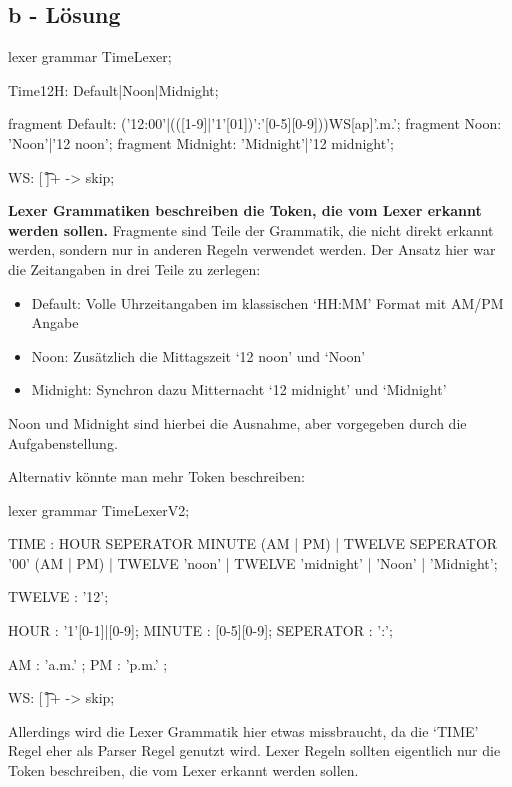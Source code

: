 \subsection*{b - Lösung}
\begin{code}[language=antlr, caption={Lexer für Date/Time}, label={lst:Aufgabe1b}]
    lexer grammar TimeLexer;

    Time12H: Default|Noon|Midnight;

    fragment Default: ('12:00'|(([1-9]|'1'[01])':'[0-5][0-9]))WS[ap]'.m.';
    fragment Noon: 'Noon'|'12 noon';
    fragment Midnight: 'Midnight'|'12 midnight';

    WS: [ \t\r\n]+ -> skip;
\end{code}

\textbf{Lexer Grammatiken beschreiben die Token, die vom Lexer erkannt werden sollen.}
Fragmente sind Teile der Grammatik, die nicht direkt erkannt werden, sondern nur in anderen Regeln verwendet werden. \newline
Der Ansatz hier war die Zeitangaben in drei Teile zu zerlegen: \newline
\begin{itemize}
    \item Default: Volle Uhrzeitangaben im klassischen `HH:MM' Format mit AM/PM Angabe
    \item Noon: Zusätzlich die Mittagszeit `12 noon' und `Noon'
    \item Midnight: Synchron dazu Mitternacht `12 midnight' und `Midnight'
\end{itemize}
Noon und Midnight sind hierbei die Ausnahme, aber vorgegeben durch die Aufgabenstellung. \newline

\newpage

Alternativ könnte man mehr Token beschreiben:
\begin{code}[language=antlr, caption={alternativer Lexer}, label={lst:Aufgabe1bV2}]
    lexer grammar TimeLexerV2;

    TIME : HOUR SEPERATOR MINUTE (AM | PM)
    | TWELVE SEPERATOR '00' (AM | PM)
    | TWELVE 'noon'
    | TWELVE 'midnight'
    | 'Noon'
    | 'Midnight';

    TWELVE : '12';

    HOUR : '1'[0-1]|[0-9];
    MINUTE : [0-5][0-9];
    SEPERATOR : ':';

    AM : 'a.m.' ;
    PM : 'p.m.' ;

    WS: [ \t\r\n]+ -> skip;
\end{code}
Allerdings wird die Lexer Grammatik hier etwas missbraucht, da die `TIME' Regel eher als Parser Regel genutzt wird.
Lexer Regeln sollten eigentlich nur die Token beschreiben, die vom Lexer erkannt werden sollen. \newline

\newpage